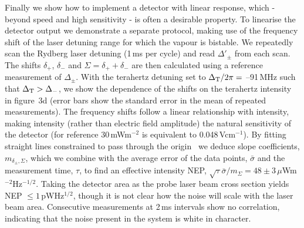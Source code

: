 \documentclass[twocolumn,aps,prl,nobibnotes,8pt]{revtex4-1}
\begin{document}
Finally we show how to implement a detector with linear response, which - beyond speed and high sensitivity - is often a desirable property.
To linearise the detector output we demonstrate a separate protocol, making use of the frequency shift of the laser detuning range for which the vapour is bistable.
We repeatedly scan the Rydberg laser detuning (1\,ms per cycle) and read $\Delta'_{\pm}$ from each scan.
The shifts $\delta_{+}$, $\delta_{-}$ and $\Sigma = \delta_{+} + \delta_{-}$ are then calculated using a reference measurement of $\Delta_{\pm}$.
With the terahertz detuning set to $\Delta_{\rm{T}}/2\pi=$ --91\,MHz such that $\Delta_{\rm{T}} > \Delta_{-}$, we show the dependence of the shifts on the terahertz intensity in figure~3d (error bars show the standard error in the mean of repeated measurements). 
The frequency shifts follow a linear relationship with intensity, making intensity (rather than electric field amplitude) the natural sensitivity of the detector (for reference 30\,mWm$^{-2}$ is equivalent to 0.048\,Vcm$^{-1}$). 
By fitting straight lines constrained to pass through the origin~\cite{Hughes10} we deduce slope coefficients, $m_{\delta_{\pm},\Sigma}$, which we combine with the average error of the data points, $\bar{\sigma}$ and the measurement time, $\tau$, to find an effective intensity NEP, $\sqrt{\tau}\bar{\sigma} / m_{\Sigma} = 48\pm 3$\,$\mu$Wm$^{-2}$Hz$^{-1/2}$.
Taking the detector area as the probe laser beam cross section yields NEP $\leq 1$\,pWHz$^{1/2}$, though it is not clear how the noise will scale with the laser beam area.
Consecutive measurements at 2\,ms intervals show no correlation, indicating that the noise present in the system is white in character.
\end{document}
